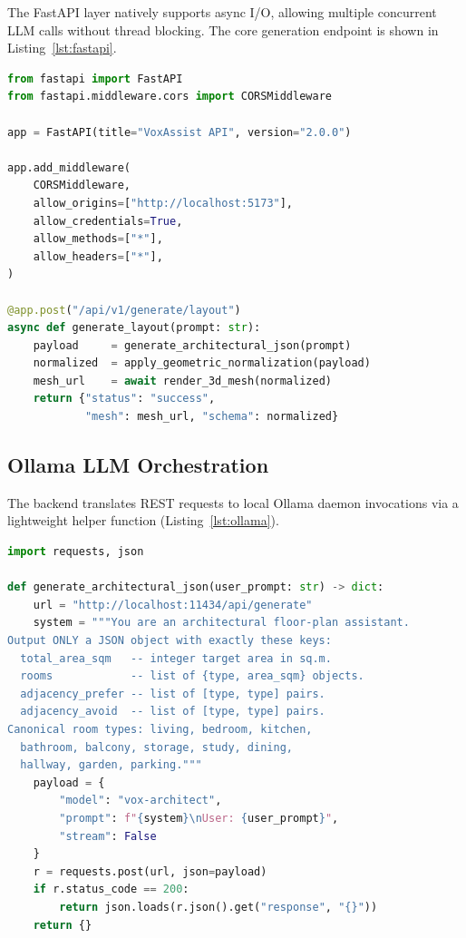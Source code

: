 \documentclass[12pt, a4paper]{article}
\begin{document}
The FastAPI layer natively supports async I/O, allowing multiple concurrent LLM
calls without thread blocking. The core generation endpoint is shown in
Listing~\ref{lst:fastapi}.

\begin{lstlisting}[language=Python, caption=FastAPI layout generation endpoint.,
                   label=lst:fastapi]
from fastapi import FastAPI
from fastapi.middleware.cors import CORSMiddleware

app = FastAPI(title="VoxAssist API", version="2.0.0")

app.add_middleware(
    CORSMiddleware,
    allow_origins=["http://localhost:5173"],
    allow_credentials=True,
    allow_methods=["*"],
    allow_headers=["*"],
)

@app.post("/api/v1/generate/layout")
async def generate_layout(prompt: str):
    payload     = generate_architectural_json(prompt)
    normalized  = apply_geometric_normalization(payload)
    mesh_url    = await render_3d_mesh(normalized)
    return {"status": "success",
            "mesh": mesh_url, "schema": normalized}
\end{lstlisting}

\subsection{Ollama LLM Orchestration}

The backend translates REST requests to local Ollama daemon invocations via a
lightweight helper function (Listing~\ref{lst:ollama}).

\begin{lstlisting}[language=Python, caption=Ollama payload handler.,
                   label=lst:ollama]
import requests, json

def generate_architectural_json(user_prompt: str) -> dict:
    url = "http://localhost:11434/api/generate"
    system = """You are an architectural floor-plan assistant.
Output ONLY a JSON object with exactly these keys:
  total_area_sqm   -- integer target area in sq.m.
  rooms            -- list of {type, area_sqm} objects.
  adjacency_prefer -- list of [type, type] pairs.
  adjacency_avoid  -- list of [type, type] pairs.
Canonical room types: living, bedroom, kitchen,
  bathroom, balcony, storage, study, dining,
  hallway, garden, parking."""
    payload = {
        "model": "vox-architect",
        "prompt": f"{system}\nUser: {user_prompt}",
        "stream": False
    }
    r = requests.post(url, json=payload)
    if r.status_code == 200:
        return json.loads(r.json().get("response", "{}"))
    return {}
\end{lstlisting}
\end{document}
